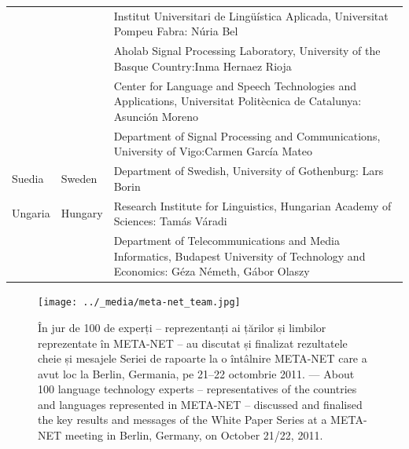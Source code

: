 \begin{longtable}{@{}llp{113mm}@{}}
  & & Institut Universitari de Lingüística Aplicada, Universitat Pompeu Fabra: Núria Bel \\ \addlinespace 
  & & Aholab Signal Processing Laboratory, University of the Basque Country:\newline Inma Hernaez Rioja \\ \addlinespace 
  & & Center for Language and Speech Technologies and Applications, Universitat Politècnica de Catalunya:  Asunción Moreno \\ \addlinespace 
  & & Department of Signal Processing and Communications, University of Vigo:\newline Carmen García Mateo \\ \addlinespace 
  Suedia & \textcolor{grey1}{Sweden} & Department of Swedish, University of Gothenburg: Lars Borin \\ \addlinespace 
  Ungaria & \textcolor{grey1}{Hungary} & Research Institute for Linguistics, Hungarian Academy of Sciences: Tamás Váradi\\  \addlinespace
  & & Department of Telecommunications and Media Informatics, Budapest University of Technology and Economics: Géza Németh, Gábor Olaszy
\end{longtable}
\normalsize

\renewcommand*{\figureformat}{}
\renewcommand*{\captionformat}{}

\begin{figure}[htbp]
  \center
  \texttt{[image: ../\_media/meta-net\_team.jpg]}
  \caption{În jur de 100 de experți -- reprezentanți ai țărilor și limbilor reprezentate în META-NET -- au discutat și finalizat rezultatele cheie și mesajele Seriei de rapoarte la o întâlnire META-NET care a avut loc la Berlin, Germania, pe 21--22 octombrie 2011. --- \textcolor{grey1}{About 100 language technology experts -- representatives of the countries and languages represented in META-NET -- discussed and finalised the key results and messages of the White Paper Series at a META-NET meeting in Berlin, Germany, on October 21/22, 2011.}}
\end{figure}

\cleardoublepage

{}
\label{whitepaperseries}

